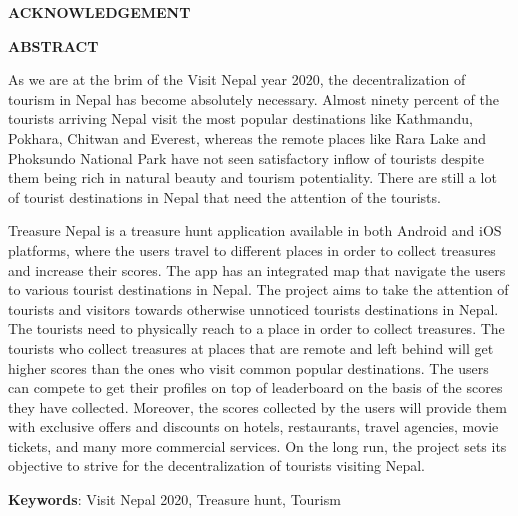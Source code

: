 \documentclass[12pt, a4paper, oneside]{article}
\begin{document}
\large
\begin{center}
	\textbf{ACKNOWLEDGEMENT}
\end{center}

\normalsize
\vspace{40px}
\lipsum[2]

\break





\large
\begin{center}
	\textbf{ABSTRACT}
\end{center}
\normalsize
As we are at the brim of the Visit Nepal year 2020, the decentralization of tourism in Nepal has become absolutely necessary. Almost ninety percent of the tourists arriving Nepal visit the most popular destinations like Kathmandu, Pokhara, Chitwan and Everest, whereas the remote places like Rara Lake and Phoksundo National Park have not seen satisfactory inflow of tourists despite them being rich in natural beauty and tourism potentiality. There are still a lot of tourist destinations in Nepal that need the attention of the tourists.

Treasure Nepal is a treasure hunt application available in both Android and iOS platforms, where the users travel to different places in order to collect treasures and increase their scores. The app has an integrated map that navigate the users to various tourist destinations in Nepal. The project aims to take the attention of tourists and visitors towards otherwise unnoticed tourists destinations in Nepal. The tourists need to physically reach to a place in order to collect treasures. The tourists who collect treasures at places that are remote and left behind will get higher scores than the ones who visit common popular destinations. The users can compete to get their profiles on top of leaderboard on the basis of the scores they have collected. Moreover, the scores collected by the users will provide them with exclusive offers and discounts on hotels, restaurants, travel agencies, movie tickets, and many more commercial services. On the long run, the project sets its objective to strive for the decentralization of tourists visiting Nepal.

\textbf{Keywords}: Visit Nepal 2020, Treasure hunt, Tourism\\

\break
\end{document}
